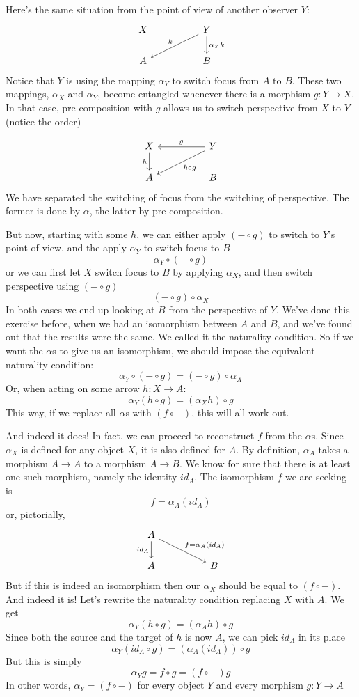 \documentclass[DaoFP]{subfiles}
\begin{document}
Here's the same situation from the point of view of another observer $Y$:
\[
 \begin{tikzcd}
 X
  && Y
 \arrow[lld, "k"']
 \arrow[d, "\alpha_Y k"]
 \\
 A
  && B
 \end{tikzcd}
\]
Notice that $Y$ is using the mapping $\alpha_Y$ to switch focus from $A$ to $B$. These two mappings, $\alpha_X$ and $\alpha_Y$, become entangled whenever there is a morphism $g \colon Y \to X$. In that case, pre-composition with $g$ allows us to switch perspective from $X$ to $Y$ (notice the order)

\[
 \begin{tikzcd}
 X
 \arrow[d, "h"']
 && Y
 \arrow[ll, "g"']
 \arrow[lld, "h \circ g"]
 \\
 A
  && B
 \end{tikzcd}
\]
We have separated the switching of focus from the switching of perspective. The former is done by $\alpha$, the latter by pre-composition.

But now, starting with some $h$, we can either apply $(- \circ g)$ to switch to $Y$'s point of view, and the apply $\alpha_Y$ to switch focus to $B$
\[ \alpha_Y \circ (- \circ g) \]
or we can first let $X$ switch focus to $B$ by applying $\alpha_X$, and then switch perspective using $(- \circ g)$
\[ (- \circ g) \circ \alpha_X \]
In both cases we end up looking at $B$ from the perspective of $Y$. We've done this exercise before, when we had an isomorphism between $A$ and $B$, and we've found out that the results were the same. We called it the naturality condition. So if we want the $\alpha$s to give us an isomorphism, we should impose the equivalent naturality condition:
\[ \alpha_Y \circ (- \circ g) = (- \circ g) \circ \alpha_X \]
Or, when acting on some arrow $h \colon X \to A$:
\[\alpha_Y(h \circ g) = (\alpha_X h) \circ g \]
This way, if we replace all $\alpha$s with $(f \circ -)$, this will all work out. 

And indeed it does! In fact, we can proceed to reconstruct $f$ from the $\alpha$s. Since $\alpha_X$ is defined for any object $X$, it is also defined for $A$. By definition, $\alpha_A$ takes a morphism $A \to A$ to a morphism $A \to B$. We know for sure that there is at least one such morphism, namely the identity $id_A$. The isomorphism $f$ we are seeking is
\[f = \alpha_A (id_A)\]
or, pictorially,
\[
 \begin{tikzcd}
 A
 \arrow[d, "id_A"']
 \arrow[rrd, "f = \alpha_A (id_A)"]
  \\
 A
  && B
 \end{tikzcd}
\]
But if this is indeed an isomorphism then our $\alpha_X$ should be equal to  $(f \circ -)$. And indeed it is! Let's rewrite the naturality condition replacing $X$ with $A$. We get
\[\alpha_Y(h \circ g) = (\alpha_A h) \circ g \]
Since both the source and the target of $h$ is now $A$, we can pick $id_A$ in its place
\[\alpha_Y (id_A \circ g) = (\alpha_A (id_A)) \circ g \]
But this is simply
\[\alpha_Y g = f \circ g = (f \circ -) g\]
In other words, $\alpha_Y = (f \circ -)$ for every object $Y$ and every morphism $g \colon Y \to A$
\end{document}
